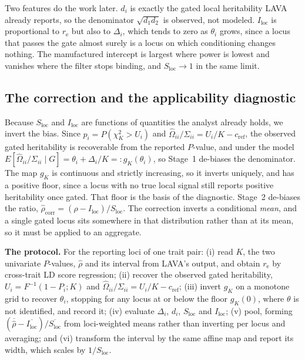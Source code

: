 \documentclass[12pt,a4paper]{article}
\newcommand{\rh}{\hat{\rho}}
\newcommand{\Slocus}{S_{\mathrm{loc}}}
\newcommand{\Ilocus}{I_{\mathrm{loc}}}
\newcommand{\re}{r_{\mathrm{e}}}
\newcommand{\crf}{c_{\mathrm{ref}}}
\begin{document}
Two features do the work later. $d_i$ is exactly the gated local heritability LAVA already
reports, so the denominator $\sqrt{d_1d_2}$ is observed, not modeled. $\Ilocus$ is
proportional to $\re$ but also to $\Delta_i$, which tends to zero as $\theta_i$ grows,
since a locus that passes the gate almost surely is a locus on which conditioning changes
nothing. The manufactured intercept is largest where power is lowest and vanishes where the
filter stops binding, and $\Slocus\to1$ in the same limit.

\subsection{The correction and the applicability diagnostic}\label{sec:correction}

Because $\Slocus$ and $\Ilocus$ are functions of quantities the analyst already holds, we
invert the bias. Since $p_i=P(\chi^2_K>U_i)$ and $\hat\Omega_{ii}/\Sigma_{ii}=U_i/K-\crf$,
the observed gated heritability is recoverable from the reported $P$-value, and under the
model $E[\hat\Omega_{ii}/\Sigma_{ii}\mid G]=\theta_i+\Delta_i/K=:g_K(\theta_i)$, so
Stage~1 de-biases the denominator. The map $g_K$ is continuous and strictly increasing, so
it inverts uniquely, and has a positive floor, since a locus with no true local signal
still reports positive heritability once gated. That floor is the basis of the diagnostic.
Stage~2 de-biases the ratio, $\rh_{\mathrm{corr}}=(\rh-\Ilocus)/\Slocus$. The correction
inverts a conditional \emph{mean}, and a single gated locus sits somewhere in that
distribution rather than at its mean, so it must be applied to an aggregate.

\medskip
\noindent\textbf{The protocol.} For the reporting loci of one trait pair: (i) read $K$,
the two univariate $P$-values, $\rh$ and its interval from LAVA's output, and obtain $\re$
by cross-trait LD score regression; (ii) recover the observed gated heritability,
$U_i=F^{-1}(1-P_i;K)$ and $\hat\Omega_{ii}/\Sigma_{ii}=U_i/K-\crf$; (iii) invert $g_K$ on a
monotone grid to recover $\theta_i$, stopping for any locus at or below the floor
$g_K(0)$, where $\theta$ is not identified, and record it; (iv) evaluate $\Delta_i$, $d_i$,
$\Slocus$ and $\Ilocus$; (v) pool, forming
$(\overline{\rh}-\overline{\Ilocus})/\overline{\Slocus}$ from loci-weighted means rather
than inverting per locus and averaging; and (vi) transform the interval by the same affine
map and report its width, which scales by $1/\Slocus$.
\end{document}
